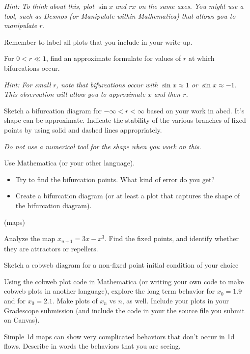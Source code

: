 \documentclass[12pt,letterpaper,noanswers]{exam}
\begin{document}
\begin{questions}
\begin{parts}
\emph{Hint: To think about this, plot $\sin x$ and $r x$ on the same axes.  You might use a tool, such as Desmos (or Manipulate within Mathematica) that allows you to manipulate $r$.}

Remember to label all plots that you include in your write-up.
\item For $0<r\ll 1$, find an approximate formulate for values of $r$ at which bifurcations occur.  

\emph{Hint: For small $r$, note that bifurcations occur with $\sin x \approx 1$ or $\sin x \approx -1$.  This observation will allow you to approximate $x$ and then $r$.}
\item Sketch a bifurcation diagram for $-\infty < r < \infty$ based on your work in abcd.  It's shape can be approximate.  Indicate the stability of the various branches of fixed points by using solid and dashed lines appropriately.

\emph{Do not use a numerical tool for the shape when you work on this.}
\item Use Mathematica (or your other language).
\begin{itemize}
\itemsep-0.1em
\item Try to find the bifurcation points.  What kind of error do you get?
\item Create a bifurcation diagram (or at least a plot that captures the shape of the bifurcation diagram).
\end{itemize}
\end{parts}

\question (maps)
\begin{parts}
\item Analyze the map $x_{n+1} = 3x - x^3$.  Find the fixed points, and identify whether they are attractors or repellers.
\item Sketch a cobweb diagram for a non-fixed point initial condition of your choice
\item Using the cobweb plot code in Mathematica (or writing your own code to make cobweb plots in another language), explore the long term behavior for $x_0 = 1.9$ and for $x_0 = 2.1$.  Make plots of $x_n$ vs $n$, as well.  Include your plots in your Gradescope submission (and include the code in your the source file you submit on Canvas).  
\item Simple 1d maps can show very complicated behaviors that don't occur in 1d flows. Describe in words the behaviors that you are seeing. 
\end{parts}



\end{questions}
\end{document}
